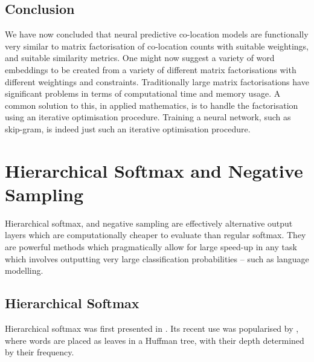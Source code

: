 \documentclass[parskip]{komatufte}
\begin{document}
\subsection{Conclusion}
We have now concluded that neural predictive co-location models are functionally very similar to matrix factorisation of co-location counts with suitable weightings, and suitable similarity metrics.
One might now suggest a variety of word embeddings to be created from a variety of different matrix factorisations with different weightings and constraints.
Traditionally large matrix factorisations have significant problems in terms of computational time and memory usage.
A common solution to this, in applied mathematics, is to handle the factorisation using an iterative optimisation procedure.
Training a neural network, such as skip-gram, is indeed just such an iterative optimisation procedure.




\section{Hierarchical Softmax and Negative Sampling}\label{sec:hierachical-softmax-and-negative-sampling}
Hierarchical softmax, and negative sampling are effectively alternative output layers which are computationally cheaper to evaluate than regular softmax.
They are powerful methods which pragmatically allow for large speed-up in any task which involves outputting very large classification probabilities -- such as language modelling.


\subsection{Hierarchical Softmax}\label{sec:hierarchical-softmax}
Hierarchical softmax was first presented in  .
Its recent use was popularised by , where words are placed as leaves in a Huffman tree, with their depth determined by their frequency.


\end{document}
